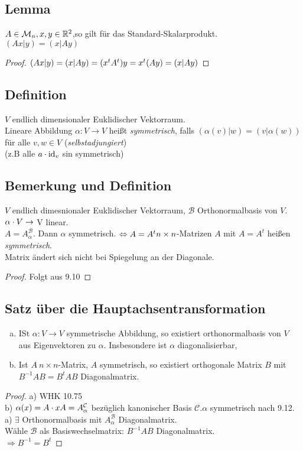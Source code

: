 \subsection{Lemma}
$A \in \mathcal{M}_n ,x,y \in \mathbb{R}^2$,so gilt für das Standard-Skalarprodukt.\\
$(Ax|y) = (x|Ay)$
\begin{proof}
$(Ax|y) = (x|Ay)\\
= (x^t A^t)y = x^t (A y) = (x| A y)$
\end{proof}
\subsection{Definition}
$V$ endlich dimensionaler Euklidischer Vektorraum.\\
Lineare Abbildung $\alpha: V \longrightarrow V$ hei\ss t \emph{symmetrisch}, falls $(\alpha(v)|w) = (v|\alpha(w))$ für alle $v,w \in V$ (\emph{selbstadjungiert})\\
(z.B alle $a \cdot \mathrm{id}_v$ sin symmetrisch)
\subsection{Bemerkung und Definition}
$V$ endlich dimesnionaler Euklidischer Vektorraum, $\mathcal{B}$ Orthonormalbasis von $V$.\\
$\alpha \cdot V \rightarrow$ V linear.\\
$A = A^\mathcal{B}_\alpha$. Dann $\alpha$ symmetrisch. $\Leftrightarrow A = A^t\\
n \times n$-Matrizen $A$ mit $A = A^t$ hei\ss en \emph{symmetrisch}.\\
Matrix ändert sich nicht bei Spiegelung an der Diagonale.
\begin{proof}
Folgt aus 9.10
\end{proof}
\subsection{Satz über die Hauptachsentransformation}\label{sec:\thesubsection}
\begin{enumerate}[a)]
\item ISt $\alpha: V \to V$ symmetrische Abbildung, so existiert orthonormalbasis von $V$ aus Eigenvektoren zu $\alpha$. Insbesondere ist $\alpha$ diagonalisierbar,
\item Ist $A\ n \times n$-Matrix, $A$ symmetrisch, so existiert orthogonale Matrix $B$ mit $B^{-1}AB = B^tAB$ Diagonalmatrix.
\end{enumerate}
\begin{proof}
a) WHK 10.75\\
b) $\alpha(x) = A \cdot x\\
A = A^\mathcal{C}_\alpha$ bezüglich kanonischer Basis $\mathcal{C}.\alpha$ symmetrisch nach 9.12. a) $\exists$ Orthonormalbasis mit $A^{\mathcal B}_\alpha$ Diagonalmatrix.\\
Wähle $\mathcal{B}$ als Basiswechselmatrix: $B^{-1}AB$ Diagonalmatrix.\\
$\Rightarrow B^{-1} = B^t$
\end{proof}
